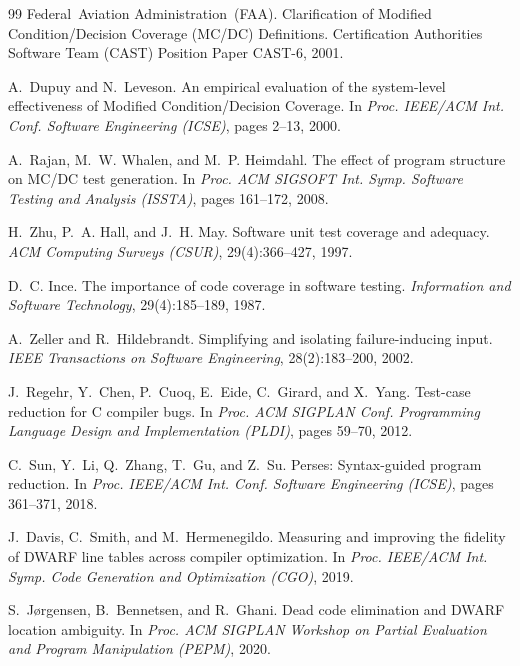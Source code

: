 \documentclass[sigconf,review,anonymous=false]{acmart}
\theoremstyle{definition}
\begin{document}
\begin{thebibliography}{99}
Federal~Aviation Administration~(FAA).
\newblock Clarification of Modified Condition/Decision Coverage (MC/DC) Definitions.
\newblock Certification Authorities Software Team (CAST) Position Paper CAST-6, 2001.

A.~Dupuy and N.~Leveson.
\newblock An empirical evaluation of the system-level effectiveness of Modified Condition/Decision Coverage.
\newblock In \emph{Proc. IEEE/ACM Int. Conf. Software Engineering (ICSE)}, pages 2--13, 2000.

A.~Rajan, M.~W. Whalen, and M.~P. Heimdahl.
\newblock The effect of program structure on MC/DC test generation.
\newblock In \emph{Proc. ACM SIGSOFT Int. Symp. Software Testing and Analysis (ISSTA)}, pages 161--172, 2008.

H.~Zhu, P.~A. Hall, and J.~H. May.
\newblock Software unit test coverage and adequacy.
\newblock \emph{ACM Computing Surveys (CSUR)}, 29(4):366--427, 1997.

D.~C. Ince.
\newblock The importance of code coverage in software testing.
\newblock \emph{Information and Software Technology}, 29(4):185--189, 1987.

A.~Zeller and R.~Hildebrandt.
\newblock Simplifying and isolating failure-inducing input.
\newblock \emph{IEEE Transactions on Software Engineering}, 28(2):183--200, 2002.

J.~Regehr, Y.~Chen, P.~Cuoq, E.~Eide, C.~Girard, and X.~Yang.
\newblock Test-case reduction for C compiler bugs.
\newblock In \emph{Proc. ACM SIGPLAN Conf. Programming Language Design and Implementation (PLDI)}, pages 59--70, 2012.

C.~Sun, Y.~Li, Q.~Zhang, T.~Gu, and Z.~Su.
\newblock Perses: Syntax-guided program reduction.
\newblock In \emph{Proc. IEEE/ACM Int. Conf. Software Engineering (ICSE)}, pages 361--371, 2018.

J.~Davis, C.~Smith, and M.~Hermenegildo.
\newblock Measuring and improving the fidelity of DWARF line tables across compiler optimization.
\newblock In \emph{Proc. IEEE/ACM Int. Symp. Code Generation and Optimization (CGO)}, 2019.

S.~J\o{}rgensen, B.~Bennetsen, and R.~Ghani.
\newblock Dead code elimination and DWARF location ambiguity.
\newblock In \emph{Proc. ACM SIGPLAN Workshop on Partial Evaluation and Program Manipulation (PEPM)}, 2020.


\end{thebibliography}
\end{document}
